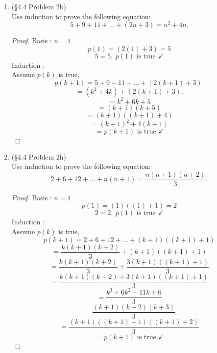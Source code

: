 \documentclass[12pt]{article}
\begin{document}
\begin{enumerate}
\begin{proof}
\end{proof}













\item (\S4.4 Problem 2b)\\
Use induction to prove the following equation:
\[5+9+11+\ldots+(2n+3)=n^2+4n.\]
\begin{proof} 
\hfill \break Basis : $n=1$ 
\[p(1)=(2(1)+3)=5\]
\[5=5, \ p(1)\text{ is true } \checkmark\]
Induction : \\
Assume $p(k)$ is true,
\[p(k+1)=5+9+11+\ldots+(2(k+1)+3).\]
\[=(k^2 + 4k) +(2(k+1)+3).\]
\[=k^2 + 6k + 5\]
\[=(k+1)(k+5)\]
\[=(k+1)((k+1)+4)\]
\[=(k+1)^2 + 4(k+1)\]
\[=p(k+1) \text{ is true.} \checkmark\]
\end{proof}












\item (\S4.4 Problem 2h)\\
Use induction to prove the following equation:
\[2+6+12+\ldots+n(n+1)=\frac{n(n+1)(n+2)}{3}.\]
\begin{proof}
\hfill \break Basis : $n=1$ 
\[p(1)=(1)((1)+1)=2\]
\[2=2, \ p(1)\text{ is true } \checkmark\]
Induction : \\
Assume $p(k)$ is true,
\[p(k+1)=2+6+12+\ldots+(k+1)((k+1)+1)\]
\[=\frac{k(k+1)(k+2)}{3}+(k+1)((k+1)+1)\]
\[=\frac{k(k+1)(k+2)}{3}+\frac{3(k+1)((k+1)+1)}{3}\]
\[=\frac{k(k+1)(k+2)+3(k+1)((k+1)+1)}{3}\]
\[=\frac{k^3 + 6k^2 + 11k + 6}{3}\]
\[=\frac{(k+1)(k+2)(k+3)}{3}\]
\[=\frac{(k+1)((k+1)+1)((k+1)+2)}{3}\]
\[=p(k+1) \text{ is true.} \checkmark\]
\end{proof}













\end{enumerate}
\end{document}
